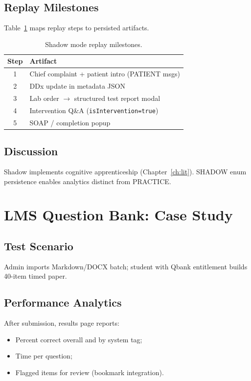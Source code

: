 \subsection{Replay Milestones}
Table~\ref{tab:shadow-milestones} maps replay steps to persisted artifacts.

\begin{table}[htbp]
  \centering
  \caption{Shadow mode replay milestones.}
  \label{tab:shadow-milestones}
  \small
  \begin{tabular}{@{}cp{9.2cm}@{}}
    \toprule
    \textbf{Step} & \textbf{Artifact} \\
    \midrule
    1 & Chief complaint + patient intro (PATIENT msgs) \\
    2 & DDx update in metadata JSON \\
    3 & Lab order $\rightarrow$ structured test report modal \\
    4 & Intervention Q\&A (\texttt{isIntervention=true}) \\
    5 & SOAP / completion popup \\
    \bottomrule
  \end{tabular}
\end{table}

\subsection{Discussion}
Shadow implements cognitive apprenticeship (Chapter~\ref{ch:lit}). SHADOW enum persistence enables analytics distinct from PRACTICE.

\section{LMS Question Bank: Case Study}
\subsection{Test Scenario}
Admin imports Markdown/DOCX batch; student with Qbank entitlement builds 40-item timed paper.

\subsection{Performance Analytics}
After submission, results page reports:
\begin{itemize}
  \item Percent correct overall and by system tag;
  \item Time per question;
  \item Flagged items for review (bookmark integration).
\end{itemize}


